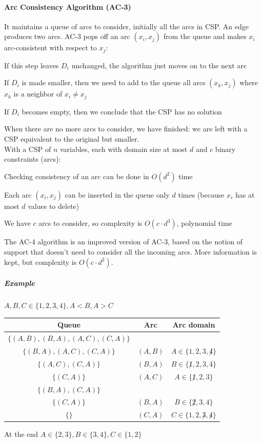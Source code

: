 \documentclass[10pt]{report}
\begin{document}
\paragraph{Arc Consistency Algorithm (AC-3)} It maintains a queue of arcs to consider, initially all the arcs in CSP. An edge produces two arcs. AC-3 pops off an arc $(x_i, x_j)$ from the queue and makes $x_i$ arc-consistent with respect to $x_j$: \begin{list}{}{}
	\item If this step leaves $D_i$ unchanged, the algorithm just moves on to the next arc
	\item If $D_i$ is made smaller, then we need to add to the queue all arcs $(x_k, x_j)$ where $x_k$ is a neighbor of $x_i \neq x_j$
	\item If $D_i$ becomes empty, then we conclude that the CSP has no solution
\end{list}
When there are no more arcs to consider, we have finished: we are left with a CSP equivalent to the original but smaller.\\
With a CSP of $n$ variables, each with domain size at most $d$ and $c$ binary constraints (arcs):
\begin{list}{}{}
	\item Checking consistency of an arc can be done in $O(d^2)$ time
	\item Each arc $(x_i, x_j)$ can be inserted in the queue only $d$ times (because $x_i$ has at most $d$ values to delete)
	\item We have $c$ arcs to consider, so complexity is $O(c\cdot d^3)$, polynomial time
\end{list}
The AC-4 algorithm is an improved version of AC-3, based on the notion of support that doesn't need to consider all the incoming arcs. More information is kept, but complexity is $O(c\cdot d^2)$.
\subparagraph{Example} $A, B, C \in \{1,2,3,4\}, A < B, A > C$\\
\begin{center}
\begin{tabular}{c c c}
	Queue & Arc & Arc domain\\
	\hline
	$\{(A,B), (B, A), (A, C), (C, A)\}$ & & \\
	$\{(B, A), (A, C), (C, A)\}$ & $(A,B)$ & $A \in \{1,2,3,\not 4\}$ \\
	$\{(A,C), (C, A)\}$ & $(B, A)$ & $B \in \{\not 1, 2, 3, 4\}$\\
	$\{(C, A)\}$ & $(A, C)$ & $A \in \{\not 1, 2, 3\}$\\
	$\{(B,A), (C, A)\}$ & & \\
	$\{(C, A)\}$ & $(B, A)$ & $B \in \{\not 2, 3, 4\}$\\
	$\{\}$ & $(C, A)$ & $C \in \{1, 2, \not 3,\not 4\}$\\
\end{tabular}
\end{center}
At the end $A\in\{2,3\}, B\in\{3,4\}, C\in\{1,2\}$
\end{document}
